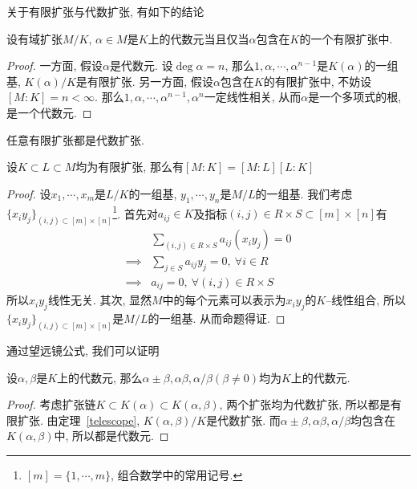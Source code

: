 关于有限扩张与代数扩张, 有如下的结论
\begin{prop}
    设有域扩张$M/K$, $\alpha\in M$是$K$上的代数元当且仅当$\alpha$包含在$K$的一个有限扩张中.
\end{prop}
\begin{proof}
    一方面, 假设$\alpha$是代数元.
    设$\deg\alpha=n$, 那么$1,\alpha,\cdots,\alpha^{n-1}$是$K(\alpha)$的一组基, $K(\alpha)/K$是有限扩张.
    另一方面, 假设$\alpha$包含在$K$的有限扩张中, 不妨设$[M:K]=n<\infty$.
    那么$1,\alpha,\cdots,\alpha^{n-1},\alpha^n$一定线性相关, 从而$\alpha$是一个多项式的根, 是一个代数元.
\end{proof}

\begin{col}
    任意有限扩张都是代数扩张.
\end{col}

\begin{thm}[望远镜公式]\label{telescope}
    设$K\subset L\subset M$均为有限扩张, 那么有$[M:K]=[M:L][L:K]$
\end{thm}
\begin{proof}
    设$x_1,\cdots,x_m$是$L/K$的一组基, $y_1,\cdots,y_n$是$M/L$的一组基.
    我们考虑$\{x_iy_j\}_{(i,j)\subset [m]\times[n]}$\footnote{$[m]=\{1,\cdots,m\}$, 组合数学中的常用记号.}.
    首先对$a_{ij}\in K$及指标$(i,j)\in R\times S\subset [m]\times[n]$有
    \begin{align*}
        &\sum_{(i,j)\in R\times S}a_{ij}(x_iy_j)=0\\
        \implies&\sum_{j\in S}a_{ij}y_j=0,\ \forall i\in R\\
        \implies&a_{ij}=0,\ \forall (i,j)\in R\times S
    \end{align*}
    所以$x_iy_j$线性无关.
    其次, 显然$M$中的每个元素可以表示为$x_iy_j$的$K$--线性组合, 所以$\{x_iy_j\}_{(i,j)\subset [m]\times[n]}$是$M/L$的一组基.
    从而命题得证.
\end{proof}

通过望远镜公式, 我们可以证明
\begin{thm}
    设$\alpha,\beta$是$K$上的代数元, 那么$\alpha\pm\beta,\alpha\beta,\alpha/\beta(\beta\neq 0)$均为$K$上的代数元.
\end{thm}
\begin{proof}
    考虑扩张链$K\subset K(\alpha)\subset K(\alpha,\beta)$, 两个扩张均为代数扩张, 所以都是有限扩张.
    由定理~\ref{telescope}, $K(\alpha,\beta)/K$是代数扩张.
    而$\alpha\pm\beta,\alpha\beta,\alpha/\beta$均包含在$K(\alpha,\beta)$中, 所以都是代数元.
\end{proof}


